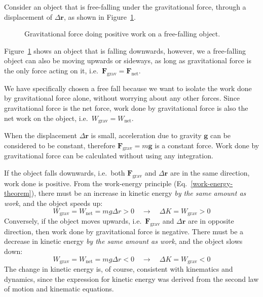 Consider an object that is free-falling under the gravitational force,
through a displacement of $\Delta\bm r$, as shown in Figure~\ref{fig:falling1}.
\begin{figure}[ht]
  \centering
  \caption{Gravitational force doing positive work on a free-falling object.}
  \label{fig:falling1}
\end{figure}
\begin{remark}
  Figure~\ref{fig:falling1} shows an object that is falling downwards, however,
  we a free-falling object can also be moving upwards or sideways, as long as
  gravitational force is the only force acting on it, i.e.\
  $\bm F_\text{grav}=\bm F_\text{net}$.
\end{remark}
We have specifically chosen a free fall because we want to isolate the work
done by gravitational force alone, without worrying about any other forces.
Since gravitational force is the net force, work done by gravitational
force is also the net work on the object, i.e.\ $W_\text{grav}=W_\text{net}$.

When the displacement $\Delta\bm r$ is small, acceleration due to gravity
$\bm g$ can be considered to be constant, therefore $\bm F_\text{grav}=m\bm g$
is a constant force. Work done by gravitational force can be calculated without
using any integration.

If the object falls downwards, i.e.\ both $\bm F_\text{grav}$ and $\Delta\bm r$
are in the same direction, work done
is positive. From the work-energy principle (Eq.~\ref{work-energy-theorem}),
there must be an increase in kinetic energy \emph{by the same amount as work},
and the object speeds up:
\begin{equation*}
  W_\text{grav}=W_\text{net}=mg\Delta r>0
  \quad\longrightarrow\quad
  \Delta K = W_\text{grav} > 0
\end{equation*}
Conversely, if the object moves upwards, i.e.\ $\bm F_\text{grav}$ and
$\Delta\bm r$ are in opposite direction, then work done by gravitational force
is negative. There must be a decrease in kinetic energy
\emph{by the same amount as work}, and the object slows down:
\begin{equation*}
  W_\text{grav}=W_\text{net}=mg\Delta r<0
  \quad\longrightarrow\quad
  \Delta K = W_\text{grav} < 0
\end{equation*}
The change in kinetic energy is, of course, consistent with kinematics and
dynamics, since the expression for kinetic energy was derived from the second
law of motion and kinematic equations.

